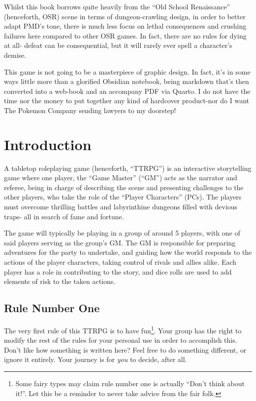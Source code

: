 \documentclass[
  11pt,
  letterpaper,
]{scrbook}
\begin{document}
Whilst this book borrows quite heavily from the ``Old School
Renaissance'' (henceforth, OSR) scene in terms of dungeon-crawling
design, in order to better adapt PMD's tone, there is much less focus on
lethal consequences and crushing failures here compared to other OSR
games. In fact, there are no rules for dying at all- defeat can be
consequential, but it will rarely ever spell a character's demise.

This game is not going to be a masterpiece of graphic design. In fact,
it's in some ways little more than a glorified Obsidian notebook, being
markdown that's then converted into a web-book and an accompany PDF via
Quarto. I do not have the time nor the money to put together any kind of
hardcover product-nor do I want The Pokemon Company sending lawyers to
my doorstep!


\chapter{Introduction}\label{introduction}

A tabletop roleplaying game (henceforth, ``TTRPG'') is an interactive
storytelling game where one player, the ``Game Master'' (``GM'') acts as
the narrator and referee, being in charge of describing the scene and
presenting challenges to the other players, who take the role of the
``Player Characters'' (PCs). The players must overcome thrilling battles
and labyrinthine dungeons filled with devious traps- all in search of
fame and fortune.

The game will typically be playing in a group of around 5 players, with
one of said players serving as the group's GM. The GM is responsible for
preparing adventures for the party to undertake, and guiding how the
world responds to the actions of the player characters, taking control
of rivals and allies alike. Each player has a role in contributing to
the story, and dice rolls are used to add elements of risk to the taken
actions.

\section{Rule Number One}\label{rule-number-one}

The very first rule of this TTRPG is to have fun\footnote{Some fairy
  types may claim rule number one is actually ``Don't think about it!''.
  Let this be a reminder to never take advice from the fair folk.}. Your
group has the right to modify the rest of the rules for your personal
use in order to accomplish this. Don't like how something is written
here? Feel free to do something different, or ignore it entirely. Your
journey is for \emph{you} to decide, after all.
\end{document}
